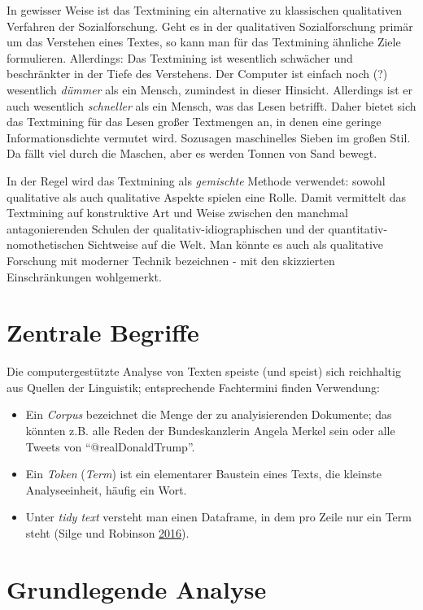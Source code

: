 \documentclass[12pt,ngerman,]{book}
\begin{document}
In gewisser Weise ist das Textmining ein alternative zu klassischen
qualitativen Verfahren der Sozialforschung. Geht es in der qualitativen
Sozialforschung primär um das Verstehen eines Textes, so kann man für
das Textmining ähnliche Ziele formulieren. Allerdings: Das Textmining
ist wesentlich schwächer und beschränkter in der Tiefe des Verstehens.
Der Computer ist einfach noch (?) wesentlich \emph{dümmer} als ein
Mensch, zumindest in dieser Hinsicht. Allerdings ist er auch wesentlich
\emph{schneller} als ein Mensch, was das Lesen betrifft. Daher bietet
sich das Textmining für das Lesen großer Textmengen an, in denen eine
geringe Informationsdichte vermutet wird. Sozusagen maschinelles Sieben
im großen Stil. Da fällt viel durch die Maschen, aber es werden Tonnen
von Sand bewegt.

In der Regel wird das Textmining als \emph{gemischte} Methode verwendet:
sowohl qualitative als auch qualitative Aspekte spielen eine Rolle.
Damit vermittelt das Textmining auf konstruktive Art und Weise zwischen
den manchmal antagonierenden Schulen der qualitativ-idiographischen und
der quantitativ-nomothetischen Sichtweise auf die Welt. Man könnte es
auch als qualitative Forschung mit moderner Technik bezeichnen - mit den
skizzierten Einschränkungen wohlgemerkt.

\section{Zentrale Begriffe}\label{zentrale-begriffe}

Die computergestützte Analyse von Texten speiste (und speist) sich
reichhaltig aus Quellen der Linguistik; entsprechende Fachtermini finden
Verwendung:

\begin{itemize}
\item
  Ein \emph{Corpus} bezeichnet die Menge der zu analyisierenden
  Dokumente; das könnten z.B. alle Reden der Bundeskanzlerin Angela
  Merkel sein oder alle Tweets von ``@realDonaldTrump''.
\item
  Ein \emph{Token} (\emph{Term}) ist ein elementarer Baustein eines
  Texts, die kleinste Analyseeinheit, häufig ein Wort.
\item
  Unter \emph{tidy text} versteht man einen Dataframe, in dem pro Zeile
  nur ein Term steht (Silge und Robinson
  \protect\hyperlink{ref-Silge2016}{2016}).
\end{itemize}

\section{Grundlegende Analyse}\label{grundlegende-analyse}
\end{document}
